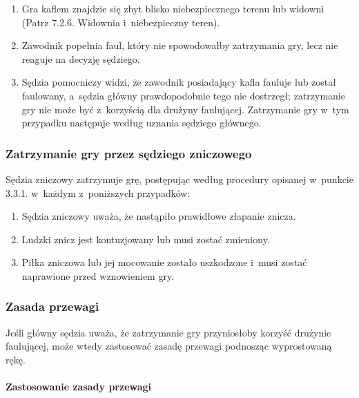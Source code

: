 \documentclass[12pt,a4paper]{article}
\begin{document}
\begin{enumerate}
	\item Gra kaflem znajdzie się zbyt blisko niebezpiecznego terenu lub
	      widowni (Patrz 7.2.6. Widownia i~niebezpieczny teren).

	\item Zawodnik popełnia faul, który nie spowodowałby zatrzymania gry, lecz
	      nie reaguje na decyzję sędziego.

	\item Sędzia pomocniczy widzi, że zawodnik posiadający kafla fauluje lub
	      został faulowany, a~sędzia główny prawdopodobnie tego nie dostrzegł;
	      zatrzymanie gry nie może być z~korzyścią dla drużyny faulującej.
	      Zatrzymanie gry w~tym przypadku następuje według uznania sędziego
	      głównego.
\end{enumerate}

\subsubsection{Zatrzymanie gry przez sędziego zniczowego}

Sędzia zniczowy zatrzymuje grę, postępując według procedury opisanej w~punkcie 3.3.1. w~każdym z~poniższych przypadków:

\begin{enumerate}
	\item
	      Sędzia zniczowy uważa, że nastąpiło prawidłowe złapanie znicza.
	\item
	      Ludzki znicz jest kontuzjowany lub musi zostać zmieniony.
	\item
	      Piłka zniczowa lub jej mocowanie zostało uszkodzone i~musi zostać
	      naprawione przed wznowieniem gry.
\end{enumerate}

\subsubsection{Zasada przewagi}
Jeśli główny sędzia uważa, że zatrzymanie gry przyniosłoby korzyść
drużynie faulującej, może wtedy zastosować zasadę przewagi podnosząc
wyprostowaną rękę.

\paragraph{Zastosowanie zasady przewagi}
\end{document}
